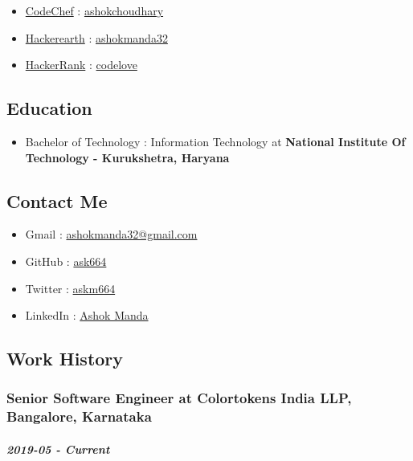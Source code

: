 \begin{itemize}
\itemsep1pt\parskip0pt
\item
  \href{http://codechef.com}{CodeChef} :
  \href{http://codechef.com/users/ashokchoudhary}{ashokchoudhary}
\item
  \href{https://www.hackerearth.com}{Hackerearth} :
  \href{https://www.hackerearth.com/@ashokmanda32}{ashokmanda32}
\item
  \href{http://hackerrank.com}{HackerRank} :
  \href{https://www.hackerrank.com/codelove}{codelove}
\end{itemize}

\subsection{Education}

\begin{itemize}
\itemsep1pt\parskip0pt
\item
  Bachelor of Technology : Information Technology at \textbf{National
  Institute Of Technology - Kurukshetra, Haryana}
\end{itemize}

\subsection{Contact Me}

\begin{itemize}
\itemsep1pt\parskip0pt
\item
  Gmail : \href{mailto:ashokmanda32@gmail.com}{ashokmanda32@gmail.com}
\item
  GitHub : \href{http://github.com/ask664}{ask664}
\item
  Twitter : \href{http://twitter.com/askm664}{askm664}
\item
  LinkedIn :
  \href{https://www.linkedin.com/in/ashok-manda-64a33aa2/}{Ashok Manda}
\end{itemize}

\subsection{Work History}

\subsubsection{Senior Software Engineer at Colortokens India LLP,
Bangalore, Karnataka}

\subparagraph{2019-05 - Current}

